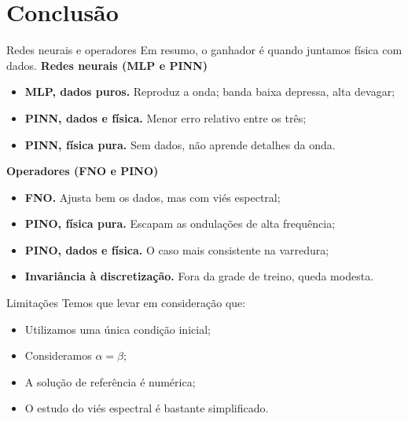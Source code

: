 \section{Conclusão}

\begin{frame}{Redes neurais e operadores}
  Em resumo, o ganhador é quando juntamos física com dados.
  \textbf{Redes neurais (MLP e PINN)}
  \begin{itemize}[<+->]
    \item \textbf{MLP, dados puros.} Reproduz a onda; banda baixa depressa, alta
          devagar;
    \item \textbf{PINN, dados e física.} Menor erro relativo entre os três;
    \item \textbf{PINN, física pura.} Sem dados, não aprende detalhes da onda.
  \end{itemize}
  \vspace{2pt}
  \textbf{Operadores (FNO e PINO)}
  \begin{itemize}[<+->]
    \item \textbf{FNO.} Ajusta bem os dados, mas com viés espectral;
    \item \textbf{PINO, física pura.} Escapam as ondulações de alta frequência;
    \item \textbf{PINO, dados e física.} O caso mais consistente na varredura;
    \item \textbf{Invariância à discretização.} Fora da grade de treino, queda modesta.
  \end{itemize}
\end{frame}

\begin{frame}{Limitações}
  Temos que levar em consideração que:
  \begin{itemize}[<+->]
    \item Utilizamos uma única condição inicial;
    \item Consideramos $\alpha = \beta$;
    \item A solução de referência é numérica;
    \item O estudo do viés espectral é bastante simplificado.
    
  \end{itemize}
\end{frame}

